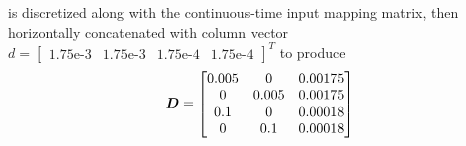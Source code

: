 is discretized along with the continuous-time input mapping matrix, then horizontally concatenated with column vector $d = \begin{bmatrix} 1.75\text{e-}3 & 1.75\text{e-}3 & 1.75\text{e-}4 & 1.75\text{e-}4 \end{bmatrix}^{T}$ to produce
\begin{equation*}
\begin{aligned}
    \vb*{D} = \begin{bmatrix}
        0.005 & 0 & 0.00175\\
        0 & 0.005 & 0.00175\\
        0.1 & 0 & 0.00018\\
        0 & 0.1 & 0.00018\\
    \end{bmatrix}
\end{aligned}
\end{equation*}
